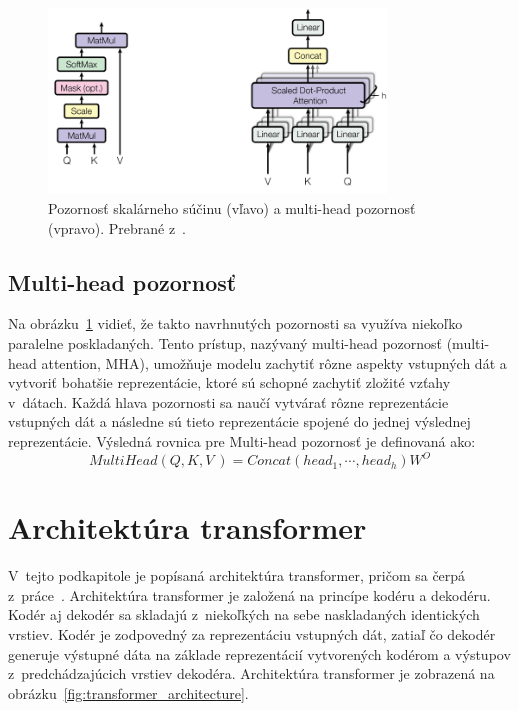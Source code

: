 \begin{figure}[!ht]
    \centering
    \includegraphics[width=0.8\textwidth]{obrazky/Attention.png}
    \caption{Pozornosť skalárneho súčinu (vľavo) a multi-head pozornosť (vpravo). Prebrané z~\cite{vaswani2023attention}.}
    \label{fig:attention}
\end{figure}

\subsection{Multi-head pozornosť}

Na obrázku~\ref{fig:attention} vidieť, že takto navrhnutých  pozornosti sa využíva niekoľko paralelne poskladaných. Tento prístup, nazývaný multi-head pozornosť (multi-head attention, MHA), umožňuje modelu zachytiť rôzne aspekty vstupných dát a vytvoriť bohatšie reprezentácie, ktoré sú schopné zachytiť zložité vzťahy v~dátach. Každá hlava pozornosti sa naučí vytvárať rôzne reprezentácie vstupných dát a následne sú tieto reprezentácie spojené do jednej výslednej reprezentácie. Výsledná rovnica pre Multi-head pozornosť je definovaná ako:
\begin{equation}
    MultiHead(Q, K, V~) = Concat(head_1, \cdots, head_h)W^O
\end{equation}

\section{Architektúra transformer}

V~tejto podkapitole je popísaná architektúra transformer, pričom sa čerpá z~práce~\cite{vaswani2023attention}. Architektúra transformer je založená na princípe kodéru a dekodéru. Kodér aj dekodér sa skladajú z~niekoľkých na sebe naskladaných identických vrstiev. Kodér je zodpovedný za reprezentáciu vstupných dát, zatiaľ čo dekodér generuje výstupné dáta na základe reprezentácií vytvorených kodérom a výstupov z~predchádzajúcich vrstiev dekodéra. Architektúra transformer je zobrazená na obrázku~\ref{fig:transformer_architecture}.

